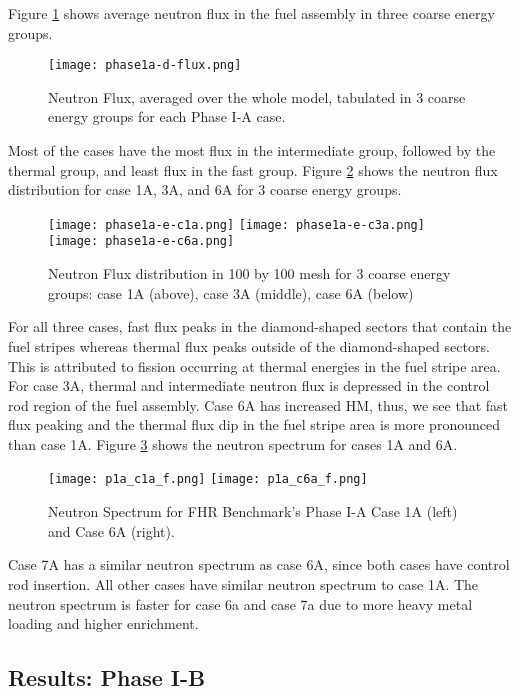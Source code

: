 Figure \ref{fig:phase1a-d} shows average neutron flux in the fuel assembly in 
three coarse energy groups. 
\begin{figure}[]
    \centering
    \texttt{[image: phase1a-d-flux.png]} 
    \caption{Neutron Flux, averaged over the whole model, tabulated in 3 coarse 
    energy groups for each Phase I-A case. }
    \label{fig:phase1a-d}
\end{figure}
Most of the cases have the most flux in the intermediate group, followed by 
the thermal group, and least flux in the fast group.    
Figure \ref{fig:phase1a-e} shows the neutron flux distribution for case 1A, 
3A, and 6A for 3 coarse energy groups. 
\begin{figure}[]
    \centering
    \texttt{[image: phase1a-e-c1a.png]} 
    \texttt{[image: phase1a-e-c3a.png]} 
    \texttt{[image: phase1a-e-c6a.png]} 
    \caption{Neutron Flux distribution in 100 by 100 mesh for 3 coarse 
    energy groups: case 1A (above), case 3A (middle), case 6A (below) }
    \label{fig:phase1a-e}
\end{figure}
For all three cases, fast flux peaks in the diamond-shaped sectors that contain the 
fuel stripes whereas thermal flux peaks outside of the diamond-shaped sectors. 
This is attributed to fission occurring at thermal energies in the fuel stripe 
area. 
For case 3A, thermal and intermediate neutron flux is depressed in the control 
rod region of the fuel assembly.  
Case 6A has increased \gls{HM}, thus, we see that fast flux peaking and the thermal 
flux dip in the fuel stripe area is more pronounced than case 1A. 
Figure \ref{fig:phase1a-f} shows the neutron spectrum for cases 1A and 6A. 
\begin{figure}[]
    \centering
    \texttt{[image: p1a\_c1a\_f.png]} 
    \texttt{[image: p1a\_c6a\_f.png]} 
    \caption{Neutron Spectrum for \gls{FHR} Benchmark's Phase I-A Case 1A 
    (left) and Case 6A (right).}
    \label{fig:phase1a-f}
\end{figure}
Case 7A has a similar neutron spectrum as case 6A, since both cases have 
control rod insertion. 
All other cases have similar neutron spectrum to case 1A.
The neutron spectrum is faster for case 6a and case 7a due to more heavy metal 
loading and higher enrichment.  

\subsection{Results: Phase I-B}


